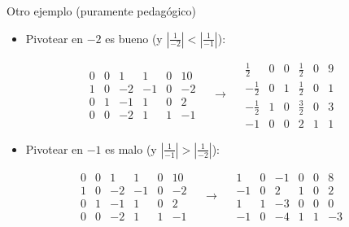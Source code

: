 \documentclass{beamer}
\begin{document}
\begin{frame}{Otro ejemplo (puramente pedagógico)}
    \begin{itemize}
        \item Pivotear en \(-2\) es bueno (y \( \left|\frac{1}{-2}\right| < \left|\frac{1}{-1}\right| \)):
    \end{itemize}

    \[
    \begin{array}{ccccc|c}
        0 & 0 & 1 & 1 & 0 & 10 \\
        \hline
        1 & 0 & -2 & -1 & 0 & -2 \\
        0 & 1 & -1 & 1 & 0 & 2 \\
        0 & 0 & -2 & 1 & 1 & -1
    \end{array}
    \quad \rightarrow \quad
    \begin{array}{ccccc|c}
        \frac{1}{2} & 0 & 0 & \frac{1}{2} & 0 & 9 \\
        \hline
        -\frac{1}{2} & 0 & 1 & \frac{1}{2} & 0 & 1 \\
        -\frac{1}{2} & 1 & 0 & \frac{3}{2} & 0 & 3 \\
        -1 & 0 & 0 & 2 & 1 & 1
    \end{array}
    \]

    \vspace{0.5cm}

    \begin{itemize}
        \item Pivotear en \(-1\) es malo (y \( \left|\frac{1}{-1}\right| > \left|\frac{1}{-2}\right| \)):
    \end{itemize}

    \[
    \begin{array}{ccccc|c}
        0 & 0 & 1 & 1 & 0 & 10 \\
        \hline
        1 & 0 & -2 & -1 & 0 & -2 \\
        0 & 1 & -1 & 1 & 0 & 2 \\
        0 & 0 & -2 & 1 & 1 & -1
    \end{array}
    \quad \rightarrow \quad
    \begin{array}{ccccc|c}
        1 & 0 & -1 & 0 & 0 & 8 \\
        \hline
        -1 & 0 & 2 & 1 & 0 & 2 \\
        1 & 1 & -3 & 0 & 0 & 0 \\
        -1 & 0 & -4 & 1 & 1 & -3
    \end{array}
    \]
\end{frame}
\end{document}
